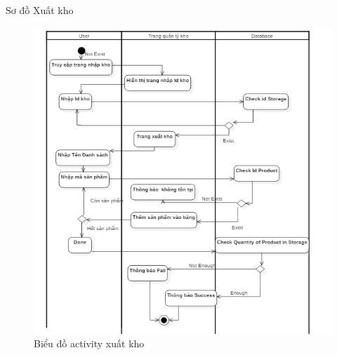 \documentclass{beamer}
\begin{document}
\begin{frame}{Sơ đồ Xuất kho}
    \begin{figure}
        \centering
        \includegraphics[scale = 0.4]{32.png}
        \caption{Biểu đồ activity xuất kho}
    \end{figure}
\end{frame}
\end{document}
